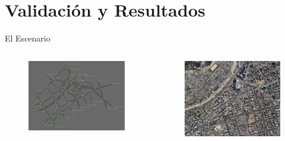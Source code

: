 \documentclass[aspectratio=169]{beamer}
\begin{document}
\section{Validación y Resultados}

\begin{frame}{El Escenario}
\begin{columns}
    \begin{column}{.5\linewidth}
        \begin{figure}[p]
            \centering
            \includegraphics[width=\linewidth]{figuras/costanera.png}
        \end{figure}
    \end{column}
    \begin{column}{.5\linewidth}
        \begin{figure}[p]
            \centering
            \includegraphics[width=\linewidth]{figuras/costanera_maps.png}
        \end{figure}
    \end{column}
\end{columns}
\end{frame}
\end{document}

